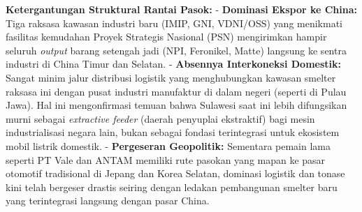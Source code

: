 \documentclass[
]{article}
\begin{document}
\textbf{Ketergantungan Struktural Rantai Pasok:} - \textbf{Dominasi
Ekspor ke China:} Tiga raksasa kawasan industri baru (IMIP, GNI,
VDNI/OSS) yang menikmati fasilitas kemudahan Proyek Strategis Nasional
(PSN) mengirimkan hampir seluruh \emph{output} barang setengah jadi
(NPI, Feronikel, Matte) langsung ke sentra industri di China Timur dan
Selatan. - \textbf{Absennya Interkoneksi Domestik:} Sangat minim jalur
distribusi logistik yang menghubungkan kawasan smelter raksasa ini
dengan pusat industri manufaktur di dalam negeri (seperti di Pulau
Jawa). Hal ini mengonfirmasi temuan bahwa Sulawesi saat ini lebih
difungsikan murni sebagai \emph{extractive feeder} (daerah penyuplai
ekstraktif) bagi mesin industrialisasi negara lain, bukan sebagai
fondasi terintegrasi untuk ekosistem mobil listrik domestik. -
\textbf{Pergeseran Geopolitik:} Sementara pemain lama seperti PT Vale
dan ANTAM memiliki rute pasokan yang mapan ke pasar otomotif tradisional
di Jepang dan Korea Selatan, dominasi logistik dan tonase kini telah
bergeser drastis seiring dengan ledakan pembangunan smelter baru yang
terintegrasi langsung dengan pasar China.
\end{document}
